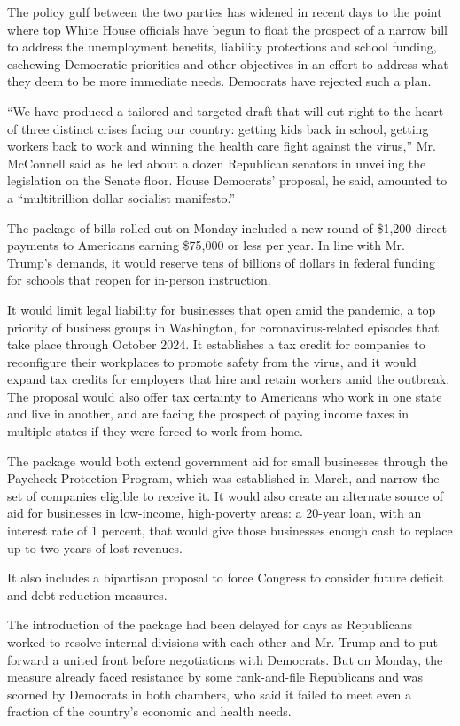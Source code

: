 The policy gulf between the two parties has widened in recent days to
the point where top White House officials have begun to float the
prospect of a narrow bill to address the unemployment benefits,
liability protections and school funding, eschewing Democratic
priorities and other objectives in an effort to address what they deem
to be more immediate needs. Democrats have rejected such a plan.

``We have produced a tailored and targeted draft that will cut right to
the heart of three distinct crises facing our country: getting kids back
in school, getting workers back to work and winning the health care
fight against the virus,'' Mr. McConnell said as he led about a dozen
Republican senators in unveiling the legislation on the Senate floor.
House Democrats' proposal, he said, amounted to a ``multitrillion dollar
socialist manifesto.''

The package of bills rolled out on Monday included a new round of
\$1,200 direct payments to Americans earning \$75,000 or less per year.
In line with Mr. Trump's demands, it would reserve tens of billions of
dollars in federal funding for schools that reopen for in-person
instruction.

It would limit legal liability for businesses that open amid the
pandemic, a top priority of business groups in Washington, for
coronavirus-related episodes that take place through October 2024. It
establishes a tax credit for companies to reconfigure their workplaces
to promote safety from the virus, and it would expand tax credits for
employers that hire and retain workers amid the outbreak. The proposal
would also offer tax certainty to Americans who work in one state and
live in another, and are facing the prospect of paying income taxes in
multiple states if they were forced to work from home.

The package would both extend government aid for small businesses
through the Paycheck Protection Program, which was established in March,
and narrow the set of companies eligible to receive it. It would also
create an alternate source of aid for businesses in low-income,
high-poverty areas: a 20-year loan, with an interest rate of 1 percent,
that would give those businesses enough cash to replace up to two years
of lost revenues.

It also includes a bipartisan proposal to force Congress to consider
future deficit and debt-reduction measures.

The introduction of the package had been delayed for days as Republicans
worked to resolve internal divisions with each other and Mr. Trump and
to put forward a united front before negotiations with Democrats. But on
Monday, the measure already faced resistance by some rank-and-file
Republicans and was scorned by Democrats in both chambers, who said it
failed to meet even a fraction of the country's economic and health
needs.


